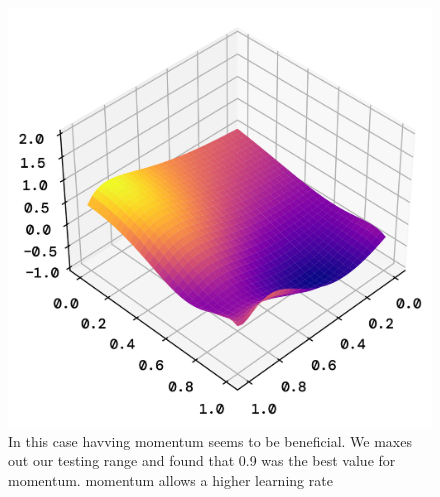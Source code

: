 \documentclass[twoside,11pt]{report}
\begin{document}
    \begin{figure}[!ht]
        \begin{minipage}[t]{0.5\textwidth - 1mm}
            \begin{center}
                \includegraphics[width=\textwidth]{../runsAndFigures/perlinNoise_logistic_pred.png}
            \end{center}
            \caption{In this case havving momentum seems to be beneficial. We maxes out our testing range 
            and found that 0.9 was the best value for momentum. momentum allows a higher learning rate
        }\label{fig:accuracy_optimizer}
        \end{minipage}
        \hspace{2mm}
        \begin{minipage}[t]{0.5\textwidth - 1mm}
            \begin{center}

\end{center}
\end{minipage}
\end{figure}
\end{document}
